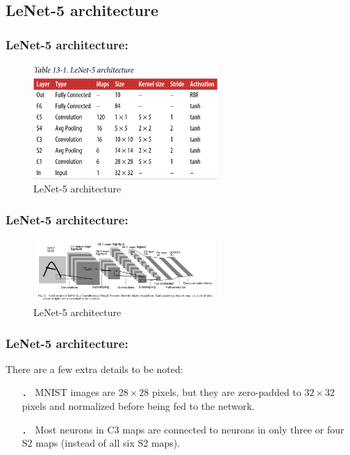 \documentclass{beamer}
\begin{document}
\subsection{LeNet-5 architecture}
    \begin{frame}
    \frametitle{LeNet-5 architecture: }
            \begin{figure}[H]
            \begin{center}
                \includegraphics[width=7cm]{table13-1}
            \end{center}
        \caption{LeNet-5 architecture}
        \end{figure}
    \end{frame}
    \begin{frame}
    \frametitle{LeNet-5 architecture: }
            \begin{figure}[H]
            \begin{center}
                \includegraphics[width=7cm]{FIGURE13-10}
            \end{center}
        \caption{LeNet-5 architecture}
        \end{figure}
    \end{frame}
    \begin{frame}
    \frametitle{LeNet-5 architecture: }
    There are a few extra details to be noted:
        \begin{itemize}
            \item[．] MNIST images are $28 \times 28$ pixels, but they are zero-padded to $32 \times 32$ pixels and normalized before being fed to the network.
            \item[．] Most  neurons  in  C3  maps  are  connected  to  neurons  in  only  three  or  four  S2 maps (instead of all six S2 maps).
        \end{itemize}
    \end{frame}
\end{document}
